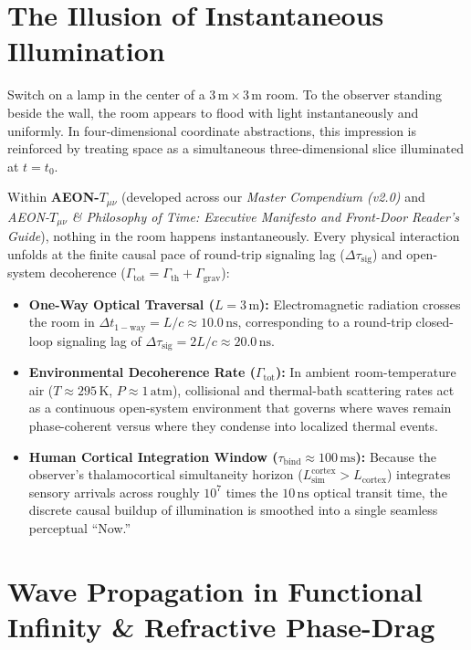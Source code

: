 \documentclass[11pt,a4paper]{article}
\begin{document}
\section{The Illusion of Instantaneous Illumination}

Switch on a lamp in the center of a $3\,\mathrm{m} \times 3\,\mathrm{m}$ room. To the observer standing beside the wall, the room appears to flood with light instantaneously and uniformly. In four-dimensional coordinate abstractions, this impression is reinforced by treating space as a simultaneous three-dimensional slice illuminated at $t = t_0$.

Within \textbf{AEON-$T_{\mu\nu}$} (developed across our \emph{Master Compendium (v2.0)} and \emph{AEON-$T_{\mu\nu}$ \& Philosophy of Time: Executive Manifesto and Front-Door Reader's Guide}), nothing in the room happens instantaneously. Every physical interaction unfolds at the finite causal pace of round-trip signaling lag ($\Delta\tau_{\mathrm{sig}}$) and open-system decoherence ($\Gamma_{\mathrm{tot}} = \Gamma_{\mathrm{th}} + \Gamma_{\mathrm{grav}}$):

\begin{itemize}
    \item \textbf{One-Way Optical Traversal ($L = 3\,\mathrm{m}$):} Electromagnetic radiation crosses the room in $\Delta t_{\mathrm{1-way}} = L / c \approx 10.0\,\mathrm{ns}$, corresponding to a round-trip closed-loop signaling lag of $\Delta\tau_{\mathrm{sig}} = 2L / c \approx 20.0\,\mathrm{ns}$.
    \item \textbf{Environmental Decoherence Rate ($\Gamma_{\mathrm{tot}}$):} In ambient room-temperature air ($T \approx 295\,\mathrm{K}$, $P \approx 1\,\mathrm{atm}$), collisional and thermal-bath scattering rates act as a continuous open-system environment that governs where waves remain phase-coherent versus where they condense into localized thermal events.
    \item \textbf{Human Cortical Integration Window ($\tau_{\mathrm{bind}} \approx 100\,\mathrm{ms}$):} Because the observer's thalamocortical simultaneity horizon ($L_{\mathrm{sim}}^{\mathrm{cortex}} > L_{\mathrm{cortex}}$) integrates sensory arrivals across roughly $10^7$ times the $10\,\mathrm{ns}$ optical transit time, the discrete causal buildup of illumination is smoothed into a single seamless perceptual ``Now.''
\end{itemize}

\section{Wave Propagation in Functional Infinity \& Refractive Phase-Drag}
\end{document}
